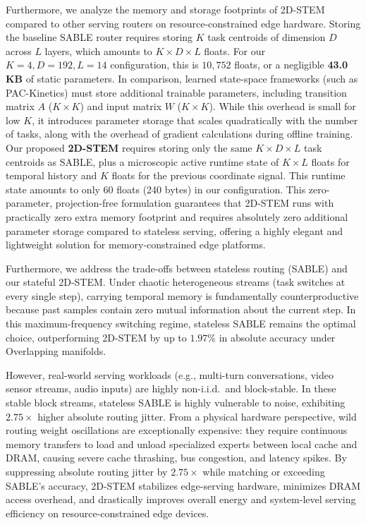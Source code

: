 Furthermore, we analyze the memory and storage footprints of 2D-STEM compared to other serving routers on resource-constrained edge hardware. Storing the baseline SABLE router requires storing $K$ task centroids of dimension $D$ across $L$ layers, which amounts to $K \times D \times L$ floats. For our $K=4, D=192, L=14$ configuration, this is $10,752$ floats, or a negligible \textbf{43.0 KB} of static parameters. In comparison, learned state-space frameworks (such as PAC-Kinetics) must store additional trainable parameters, including transition matrix $A$ ($K \times K$) and input matrix $W$ ($K \times K$). While this overhead is small for low $K$, it introduces parameter storage that scales quadratically with the number of tasks, along with the overhead of gradient calculations during offline training. Our proposed \textbf{2D-STEM} requires storing only the same $K \times D \times L$ task centroids as SABLE, plus a microscopic active runtime state of $K \times L$ floats for temporal history and $K$ floats for the previous coordinate signal. This runtime state amounts to only $60$ floats (240 bytes) in our configuration. This zero-parameter, projection-free formulation guarantees that 2D-STEM runs with practically zero extra memory footprint and requires absolutely zero additional parameter storage compared to stateless serving, offering a highly elegant and lightweight solution for memory-constrained edge platforms.

Furthermore, we address the trade-offs between stateless routing (SABLE) and our stateful 2D-STEM. Under chaotic heterogeneous streams (task switches at every single step), carrying temporal memory is fundamentally counterproductive because past samples contain zero mutual information about the current step. In this maximum-frequency switching regime, stateless SABLE remains the optimal choice, outperforming 2D-STEM by up to $1.97\%$ in absolute accuracy under Overlapping manifolds. 

However, real-world serving workloads (e.g., multi-turn conversations, video sensor streams, audio inputs) are highly non-i.i.d.\ and block-stable. In these stable block streams, stateless SABLE is highly vulnerable to noise, exhibiting $2.75\times$ higher absolute routing jitter. From a physical hardware perspective, wild routing weight oscillations are exceptionally expensive: they require continuous memory transfers to load and unload specialized experts between local cache and DRAM, causing severe cache thrashing, bus congestion, and latency spikes. By suppressing absolute routing jitter by $2.75\times$ while matching or exceeding SABLE's accuracy, 2D-STEM stabilizes edge-serving hardware, minimizes DRAM access overhead, and drastically improves overall energy and system-level serving efficiency on resource-constrained edge devices.

